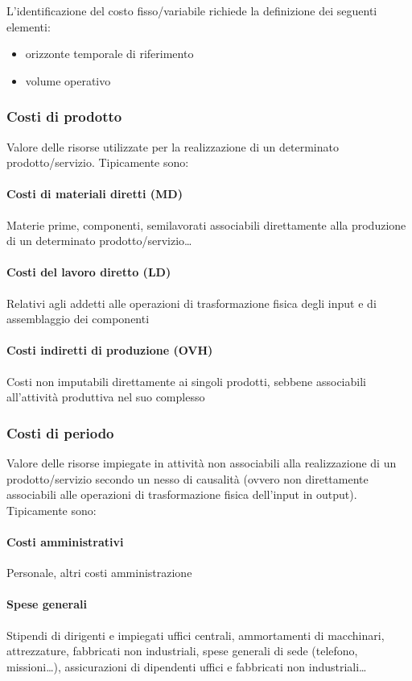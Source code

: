 L'identificazione del costo fisso/variabile richiede la definizione
dei seguenti elementi:
\begin{itemize}
    \item orizzonte temporale di riferimento
    \item volume operativo
\end{itemize}

\subsubsection{Costi di prodotto}
Valore delle risorse utilizzate per la realizzazione
di un determinato prodotto/servizio. Tipicamente sono:

\paragraph{Costi di materiali diretti (MD)}
Materie prime, componenti, semilavorati
associabili direttamente alla produzione di un determinato
prodotto/servizio\dots

\paragraph{Costi del lavoro diretto (LD)}
Relativi agli addetti alle operazioni di
trasformazione fisica degli input e di assemblaggio dei componenti

\paragraph{Costi indiretti di produzione (OVH)}
Costi non imputabili direttamente ai singoli prodotti, sebbene associabili
all’attività produttiva nel suo complesso

\subsubsection{Costi di periodo}
Valore delle risorse impiegate in attività non
associabili alla realizzazione di un prodotto/servizio secondo un nesso
di causalità (ovvero non direttamente associabili alle operazioni di
trasformazione fisica dell’input in output). Tipicamente sono:

\paragraph{Costi amministrativi}
Personale, altri costi amministrazione

\paragraph{Spese generali}
Stipendi di dirigenti e impiegati uffici centrali,
ammortamenti di macchinari, attrezzature, fabbricati non industriali,
spese generali di sede (telefono, missioni\dots), assicurazioni di
dipendenti uffici e fabbricati non industriali\dots

